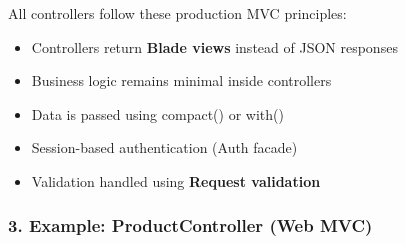 \documentclass[12pt,a4paper]{article}
\begin{document}
All controllers follow these production MVC principles:

\begin{itemize}[noitemsep]
    \item Controllers return \textbf{Blade views} instead of JSON responses
    \item Business logic remains minimal inside controllers
    \item Data is passed using compact() or with()
    \item Session-based authentication (Auth facade)
    \item Validation handled using \textbf{Request validation}
\end{itemize}

\subsubsection{3. Example: ProductController (Web MVC)}
\end{document}
